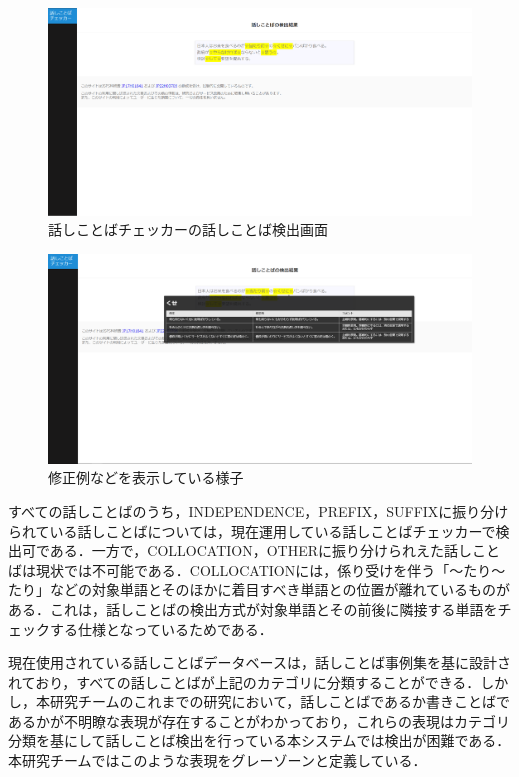 \begin{figure}[H]
	\centering
 	\includegraphics[width=150mm]{image/checkerss-result.png}
	\caption{話しことばチェッカーの話しことば検出画面}
	\label{checkerss-result}
\end{figure}

\begin{figure}[H]
	\centering
 	\includegraphics[width=150mm]{image/checkerss-popout.png}
	\caption{修正例などを表示している様子}
	\label{checkerss-popout}
\end{figure}

すべての話しことばのうち，INDEPENDENCE，PREFIX，SUFFIXに振り分けられている話しことばについては，現在運用している話しことばチェッカーで検出可である．一方で，COLLOCATION，OTHERに振り分けられえた話しことばは現状では不可能である．COLLOCATIONには，係り受けを伴う「～たり～たり」などの対象単語とそのほかに着目すべき単語との位置が離れているものがある．これは，話しことばの検出方式が対象単語とその前後に隣接する単語をチェックする仕様となっているためである．

現在使用されている話しことばデータベースは，話しことば事例集を基に設計されており，すべての話しことばが上記のカテゴリに分類することができる．しかし，本研究チームのこれまでの研究において，話しことばであるか書きことばであるかが不明瞭な表現が存在することがわかっており，これらの表現はカテゴリ分類を基にして話しことば検出を行っている本システムでは検出が困難である．本研究チームではこのような表現をグレーゾーンと定義している．

